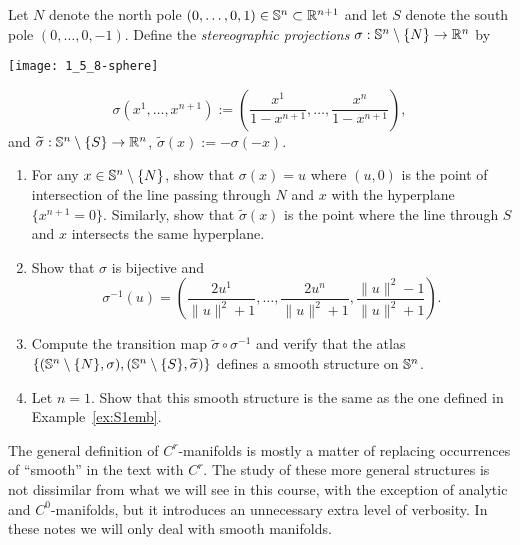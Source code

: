 \begin{exercise}\label{ex:stereo}
  Let $N$ denote the north pole $(0,\ldots,0,1)\in\mathbb{S}^n\subset\mathbb{R}^{n+1}$ and let $S$ denote the south pole $(0,\ldots,0,-1)$.
  Define the \emph{stereographic projections} $\sigma:\mathbb{S}^n\setminus\{N\}\to \mathbb{R}^n$ by
  \begin{marginfigure}
    \texttt{[image: 1\_5\_8-sphere]}
  \end{marginfigure}
  \begin{equation}
    \sigma(x^1,\ldots,x^{n+1}) := \left(\frac{x^1}{1-x^{n+1}},\ldots,\frac{x^n}{1-x^{n+1}}\right),
  \end{equation}
  and $\widetilde\sigma:\mathbb{S}^n\setminus\{S\}\to \mathbb{R}^n$, $\widetilde\sigma(x) := -\sigma(-x)$.
  \begin{enumerate}
    \item For any $x\in\mathbb{S}^n\setminus\{N\}$, show that $\sigma(x)=u$ where $(u,0)$ is the point of intersection of the line passing through $N$ and $x$ with the hyperplane $\{x^{n+1}=0\}$.
          Similarly, show that $\widetilde\sigma(x)$ is the point where the line through $S$ and $x$ intersects the same hyperplane.
    \item Show that $\sigma$ is bijective and
          \begin{equation}
            \sigma^{-1}(u) = \left(\frac{2 u^1}{\|u\|^2+1}, \ldots,\frac{2 u^n}{\|u\|^2+1},\frac{\|u\|^2-1}{\|u\|^2+1}\right).
          \end{equation}
    \item Compute the transition map $\widetilde\sigma\circ\sigma^{-1}$ and verify that the atlas $\{(\mathbb{S}^n\setminus\{N\},\sigma),(\mathbb{S}^n\setminus\{S\},\widetilde\sigma)\}$ defines a smooth structure on $\mathbb{S}^n$.
    \item Let $n=1$. Show that this smooth structure is the same as the one defined in Example~\ref{ex:S1emb}.
  \end{enumerate}
\end{exercise}

\begin{tcolorbox}
  The general definition of $C^r$-manifolds is mostly a matter of replacing occurrences of ``smooth'' in the text with $C^r$.
  The study of these more general structures is not dissimilar from what we will see in this course, with the exception of analytic and $C^0$-manifolds, but it introduces an unnecessary extra level of verbosity.
  In these notes we will only deal with smooth manifolds.
\end{tcolorbox}

